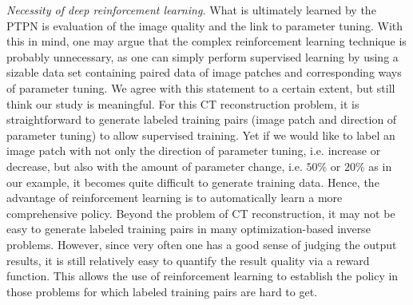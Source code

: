 \documentclass[journal]{IEEEtran}
\begin{document}
\emph{Necessity of deep reinforcement learning.} What is ultimately learned by the PTPN is evaluation of the image quality and the link to parameter tuning. With this in mind, one may argue that the complex reinforcement learning technique is probably unnecessary, as one can simply perform supervised learning by using a sizable data set containing paired data of image patches and corresponding ways of parameter tuning. We agree with this statement to a certain extent, but still think our study is meaningful. For this CT reconstruction problem, it is straightforward to generate labeled training pairs (image patch and direction of parameter tuning) to allow supervised training. Yet if we would like to label an image patch with not only the direction of parameter tuning, i.e. increase or decrease, but also with the amount of parameter change, i.e. $50\%$ or $20\%$ as in our example, it becomes quite difficult to generate training data. Hence, the advantage of reinforcement learning is to automatically learn a more comprehensive policy. Beyond the problem of CT reconstruction, it may not be easy to generate labeled training pairs in many optimization-based inverse problems. However, since very often one has a good sense of judging the output results, it is still relatively easy to quantify the result quality via a reward function. This allows the use of reinforcement learning to establish the policy in those problems for which labeled training pairs are hard to get.  
\end{document}
